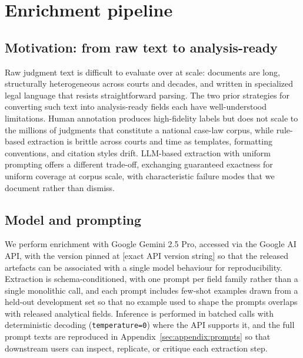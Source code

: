 
\section{Enrichment pipeline}
\label{sec:pipeline}

\subsection{Motivation: from raw text to analysis-ready}
\label{sec:pipeline:motivation}

Raw judgment text is difficult to evaluate over at scale: documents are long, structurally heterogeneous across courts and decades, and written in specialized legal language that resists straightforward parsing. The two prior strategies for converting such text into analysis-ready fields each have well-understood limitations. Human annotation produces high-fidelity labels but does not scale to the millions of judgments that constitute a national case-law corpus, while rule-based extraction is brittle across courts and time as templates, formatting conventions, and citation styles drift. LLM-based extraction with uniform prompting offers a different trade-off, exchanging guaranteed exactness for uniform coverage at corpus scale, with characteristic failure modes that we document rather than dismiss.

\subsection{Model and prompting}
\label{sec:pipeline:model}

We perform enrichment with Google Gemini 2.5 Pro, accessed via the Google AI API, with the version pinned at [exact API version string] so that the released artefacts can be associated with a single model behaviour for reproducibility. Extraction is schema-conditioned, with one prompt per field family rather than a single monolithic call, and each prompt includes few-shot examples drawn from a held-out development set so that no example used to shape the prompts overlaps with released analytical fields. Inference is performed in batched calls with deterministic decoding (\texttt{temperature=0}) where the API supports it, and the full prompt texts are reproduced in Appendix~\ref{sec:appendix:prompts} so that downstream users can inspect, replicate, or critique each extraction step.

